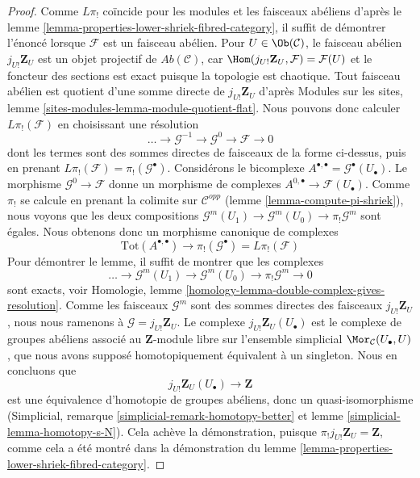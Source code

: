 \begin{proof}
Comme $L\pi_!$ coïncide pour les modules et les faisceaux abéliens d'après
le lemme \ref{lemma-properties-lower-shriek-fibred-category}, il suffit de
démontrer l'énoncé lorsque $\mathcal{F}$ est un faisceau abélien.
Pour $U \in \Ob(\mathcal{C})$, le faisceau abélien
$j_{U!}\mathbf{Z}_U$ est un objet projectif de
$\textit{Ab}(\mathcal{C})$, car
$\Hom(j_{U!}\mathbf{Z}_U, \mathcal{F}) = \mathcal{F}(U)$
et le foncteur des sections est exact puisque la topologie est chaotique.
Tout faisceau abélien est quotient d'une somme directe de
$j_{U!}\mathbf{Z}_U$ d'après Modules sur les sites, lemme
\ref{sites-modules-lemma-module-quotient-flat}. Nous pouvons donc calculer
$L\pi_!(\mathcal{F})$ en choisissant une résolution
$$
\ldots \to \mathcal{G}^{-1} \to \mathcal{G}^0 \to \mathcal{F} \to 0
$$
dont les termes sont des sommes directes de faisceaux de la forme ci-dessus,
puis en prenant $L\pi_!(\mathcal{F}) = \pi_!(\mathcal{G}^\bullet)$.
Considérons le bicomplexe
$A^{\bullet, \bullet} = \mathcal{G}^\bullet(U_\bullet)$.
Le morphisme $\mathcal{G}^0 \to \mathcal{F}$ donne un morphisme de complexes
$A^{0, \bullet} \to \mathcal{F}(U_\bullet)$.
Comme $\pi_!$ se calcule en prenant la colimite sur
$\mathcal{C}^{opp}$ (lemme \ref{lemma-compute-pi-shriek}), nous voyons que les
deux compositions
$\mathcal{G}^m(U_1) \to \mathcal{G}^m(U_0) \to \pi_!\mathcal{G}^m$
sont égales. Nous obtenons donc un morphisme canonique de complexes
$$
\text{Tot}(A^{\bullet, \bullet})
\longrightarrow
\pi_!(\mathcal{G}^\bullet) = L\pi_!(\mathcal{F})
$$
Pour démontrer le lemme, il suffit de montrer que les complexes
$$
\ldots \to \mathcal{G}^m(U_1) \to \mathcal{G}^m(U_0) \to
\pi_!\mathcal{G}^m \to 0
$$
sont exacts, voir Homologie, lemme
\ref{homology-lemma-double-complex-gives-resolution}.
Comme les faisceaux $\mathcal{G}^m$ sont des sommes directes des faisceaux
$j_{U!}\mathbf{Z}_U$, nous nous ramenons à
$\mathcal{G} = j_{U!}\mathbf{Z}_U$. Le complexe
$j_{U!}\mathbf{Z}_U(U_\bullet)$ est le complexe de groupes abéliens associé
au $\mathbf{Z}$-module libre sur l'ensemble simplicial
$\Mor_\mathcal{C}(U_\bullet, U)$, que nous avons supposé homotopiquement
équivalent à un singleton. Nous en concluons que
$$
j_{U!}\mathbf{Z}_U(U_\bullet) \to \mathbf{Z}
$$
est une équivalence d'homotopie de groupes abéliens, donc un
quasi-isomorphisme (Simplicial, remarque
\ref{simplicial-remark-homotopy-better} et lemme
\ref{simplicial-lemma-homotopy-s-N}). Cela achève la démonstration, puisque
$\pi_!j_{U!}\mathbf{Z}_U = \mathbf{Z}$, comme cela a été montré dans la
démonstration du lemme
\ref{lemma-properties-lower-shriek-fibred-category}.
\end{proof}

